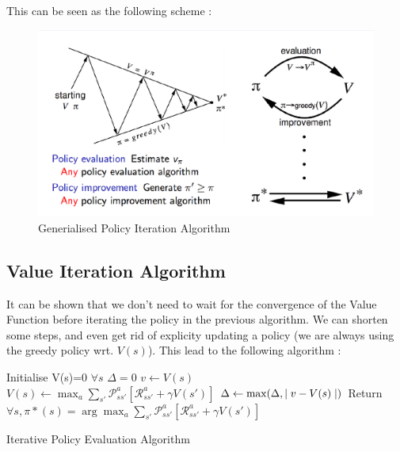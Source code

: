 		This can be seen as the following scheme : 

		\begin{figure}[ht]
			\centering
			\includegraphics[scale=0.5]{figures/GenPolicyIteration}
			\caption{Generialised Policy Iteration Algorithm}
		\end{figure}

	\subsection{Value Iteration Algorithm} %
		\label{sub:value_iteration_algorithm}
		
		It can be shown that we don't need to wait for the convergence of the Value Function before iterating the policy in the previous algorithm. We can shorten some steps, and even get rid of explicity updating a policy (we are always using the greedy policy wrt. $V(s)$). This lead to the following algorithm : 

		\begin{algorithm}[H]
				Initialise V(s)=0 $\forall s$ \;
				{
					$\Delta = 0$ \;
					{
						$v \leftarrow V(s)$ \;
						$V(s) \leftarrow \max_a \sum_{s'} \mathcal{P}^a_{ss'}[\mathcal{R}^a_{ss'} + \gamma V(s')]$ \;
						$\Delta \leftarrow \max(\Delta, \mid v - V(s)\mid) $ \;
					}
				}
				Return $\forall s, \pi*(s) = \arg \max_a  \sum_{s'} \mathcal{P}^a_{ss'}[\mathcal{R}^a_{ss'} + \gamma V(s')]$ \;
				\caption{Iterative Policy Evaluation Algorithm}
			\end{algorithm}

